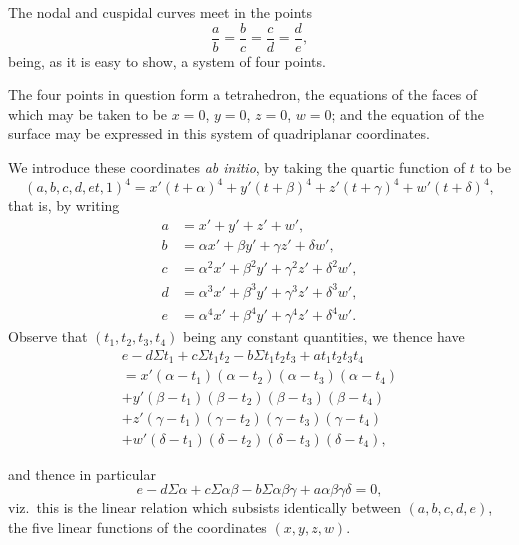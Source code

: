 \documentclass[11pt,a4paper]{article}
\theoremstyle{definition}
\begin{document}
The nodal and cuspidal curves meet in the points
\[
\frac{a}{b} = \frac{b}{c} = \frac{c}{d} = \frac{d}{e},
\]
being, as it is easy to show, a system of four points.

The four points in question form a tetrahedron, the equations of the faces of which may be taken to be $x = 0$, $y = 0$, $z = 0$, $w = 0$; and the equation of the surface may be expressed in this system of quadriplanar coordinates.

We introduce these coordinates \textit{ab initio}, by taking the quartic function of $t$ to be
\[
(a,b,c,d,e t, 1)^4 = x'(t+\alpha)^4 + y'(t+\beta)^4 + z'(t+\gamma)^4 + w'(t+\delta)^4,
\]
that is, by writing
\begin{align*}
a &= x' + y' + z' + w',\\
b &= \alpha x' + \beta y' + \gamma z' + \delta w',\\
c &= \alpha^2x' + \beta^2y' + \gamma^2z' + \delta^2w',\\
d &= \alpha^3x' + \beta^3y' + \gamma^3z' + \delta^3w',\\
e &= \alpha^4x' + \beta^4y' + \gamma^4z' + \delta^4w'.
\end{align*}
Observe that $(t_1, t_2, t_3, t_4)$ being any constant quantities, we thence have
\begin{multline*}
e - d\Sigma t_1 + c\Sigma t_1t_2 - b\Sigma t_1t_2t_3 + at_1t_2t_3t_4 \\
= x'(\alpha-t_1)(\alpha-t_2)(\alpha-t_3)(\alpha-t_4) \\
+ y'(\beta-t_1)(\beta-t_2)(\beta-t_3)(\beta-t_4) \\
+ z'(\gamma-t_1)(\gamma-t_2)(\gamma-t_3)(\gamma-t_4) \\
+ w'(\delta-t_1)(\delta-t_2)(\delta-t_3)(\delta-t_4),
\end{multline*}

\newpage

and thence in particular
\[
e - d\Sigma\alpha + c\Sigma\alpha\beta - b\Sigma\alpha\beta\gamma + a\alpha\beta\gamma\delta = 0,
\]
viz.\ this is the linear relation which subsists identically between $(a,b,c,d,e)$, the five linear functions of the coordinates $(x,y,z,w)$.
\end{document}
